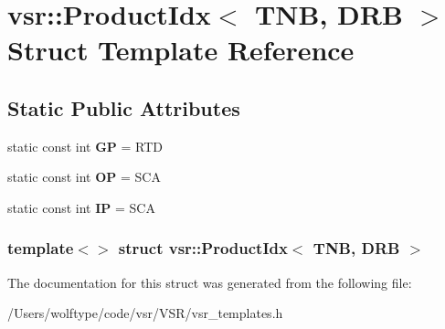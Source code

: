 \hypertarget{structvsr_1_1_product_idx_3_01_t_n_b_00_01_d_r_b_01_4}{\section{vsr\-:\-:Product\-Idx$<$ T\-N\-B, D\-R\-B $>$ Struct Template Reference}
\label{structvsr_1_1_product_idx_3_01_t_n_b_00_01_d_r_b_01_4}
}
\subsection*{Static Public Attributes}
\begin{DoxyCompactItemize}
\item 
\hypertarget{structvsr_1_1_product_idx_3_01_t_n_b_00_01_d_r_b_01_4_ac26cea4305876d1427b93e7d2d96e9dd}{static const int {\bfseries G\-P} = R\-T\-D}\label{structvsr_1_1_product_idx_3_01_t_n_b_00_01_d_r_b_01_4_ac26cea4305876d1427b93e7d2d96e9dd}

\item 
\hypertarget{structvsr_1_1_product_idx_3_01_t_n_b_00_01_d_r_b_01_4_a8313eac7664fa202e80f027f15ffd430}{static const int {\bfseries O\-P} = S\-C\-A}\label{structvsr_1_1_product_idx_3_01_t_n_b_00_01_d_r_b_01_4_a8313eac7664fa202e80f027f15ffd430}

\item 
\hypertarget{structvsr_1_1_product_idx_3_01_t_n_b_00_01_d_r_b_01_4_a89c1a89efed579a1e3a44d98276e5606}{static const int {\bfseries I\-P} = S\-C\-A}\label{structvsr_1_1_product_idx_3_01_t_n_b_00_01_d_r_b_01_4_a89c1a89efed579a1e3a44d98276e5606}

\end{DoxyCompactItemize}
\subsubsection*{template$<$$>$ struct vsr\-::\-Product\-Idx$<$ T\-N\-B, D\-R\-B $>$}



The documentation for this struct was generated from the following file\-:\begin{DoxyCompactItemize}
\item 
/\-Users/wolftype/code/vsr/\-V\-S\-R/vsr\-\_\-templates.\-h\end{DoxyCompactItemize}

